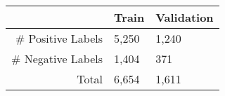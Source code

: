 \begin{tabular}{rll}

                    &  \textbf{Train}    &  \textbf{Validation}   \\ 
\midrule
\# Positive Labels  & 5,250                 & 1,240 \\
\# Negative Labels  & 1,404                 & 371 \\
\midrule
Total               & 6,654                 & 1,611 \\

\end{tabular}